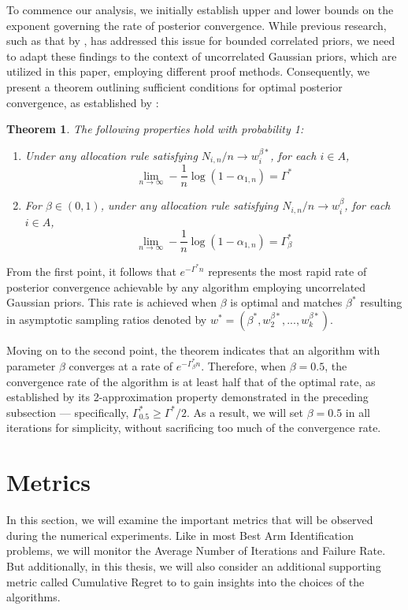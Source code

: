 \documentclass[a4paper, 12pt]{article}
\newtheorem{theorem}{Theorem}[section]
\theoremstyle{definition}
\begin{document}
To commence our analysis, we initially establish upper and lower bounds on the exponent governing the rate of posterior convergence. While previous research, such as that by \cite{toptwo}, has addressed this issue for bounded correlated priors, we need to adapt these findings to the context of uncorrelated Gaussian priors, which are utilized in this paper, employing different proof methods. Consequently, we present a theorem outlining sufficient conditions for optimal posterior convergence, as established by \cite{ttei}:

\begin{theorem}
The following properties hold with probability 1:

\begin{enumerate}
\item Under any allocation rule satisfying $N_{i,n}/n \to w_i^{\beta*}$, for each $i \in A$,
\[
\lim_{n\to\infty} -\frac{1}{n}\log(1-\alpha_{1,n}) = \Gamma^*
\]

\item For $\beta\in (0,1)$, under any allocation rule satisfying $N_{i,n}/n \to w_i^\beta$, for each $i \in A$,
\[
\lim_{n\to\infty} -\frac{1}{n}\log(1-\alpha_{1,n}) = \Gamma_\beta^*
\]
\end{enumerate}
\end{theorem}

From the first point, it follows that $e^{-\Gamma^*n}$ represents the most rapid rate of posterior convergence achievable by any algorithm employing uncorrelated Gaussian priors. This rate is achieved when $\beta$ is optimal and matches $\beta^*$ resulting in asymptotic sampling ratios denoted by $w^* = \left(\beta^*, w_2^{\beta*}, ..., w_k^{\beta*}\right)$. 

Moving on to the second point, the theorem indicates that an algorithm with parameter $\beta$ converges at a rate of $e^{-\Gamma_\beta^*n}$. Therefore, when $\beta = 0.5$, the convergence rate of the algorithm is at least half that of the optimal rate, as established by its 2-approximation property demonstrated in the preceding subsection — specifically, $\Gamma_{0.5}^* \geq \Gamma^*/2$. As a result, we will set $\beta = 0.5$ in all iterations for simplicity, without sacrificing too much of the convergence rate.



\section{Metrics} \label{sec:metrics}
In this section, we will examine the important metrics that will be observed during the numerical experiments. Like in most Best Arm Identification problems, we will monitor the Average Number of Iterations and Failure Rate. But additionally, in this thesis, we will also consider an additional supporting metric called Cumulative Regret to to gain insights into the choices of the algorithms.
\end{document}
